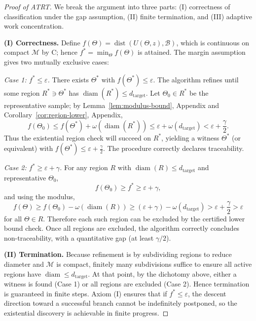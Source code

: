 \documentclass[12pt]{article}
\theoremstyle{definition}
\theoremstyle{plain}
\begin{document}
\begin{proof}[Proof of ATRT]
We break the argument into three parts: (I) correctness of classification under the gap assumption, (II) finite termination, and (III) adaptive work concentration.

\textbf{(I) Correctness.} Define \(f(\Theta)=\operatorname{dist}(U(\Theta,z),\mathcal B)\), which is continuous on compact \(\mathcal M\) by C; hence \(f^*=\min_\Theta f(\Theta)\) is attained. The margin assumption gives two mutually exclusive cases:

\emph{Case 1: \(f^*\le \varepsilon\).}  
There exists \(\Theta^*\) with \(f(\Theta^*)\le \varepsilon\). The algorithm refines until some region \(R^*\ni \Theta^*\) has \(\operatorname{diam}(R^*)\le d_{\mathrm{target}}\). Let \(\Theta_0\in R^*\) be the representative sample; by Lemma~\ref{lem:modulus-bound}, Appendix and Corollary~\ref{cor:region-lower}, Appendix,
\[
f(\Theta_0)\le f(\Theta^*) + \omega(\operatorname{diam}(R^*)) \le \varepsilon + \omega(d_{\mathrm{target}}) < \varepsilon + \frac{\gamma}{2}.
\]
Thus the existential region check will succeed on \(R^*\), yielding a witness \(\Theta^*\) (or equivalent) with \(f(\Theta^*)\le \varepsilon + \frac{\gamma}{2}\). The procedure correctly declares traceability.

\emph{Case 2: \(f^* \ge \varepsilon + \gamma\).}  
For any region \(R\) with \(\operatorname{diam}(R)\le d_{\mathrm{target}}\) and representative \(\Theta_0\),
\[
f(\Theta_0) \ge f^* \ge \varepsilon + \gamma,
\]
and using the modulus,
\[
f(\Theta) \ge f(\Theta_0) - \omega(\operatorname{diam}(R)) \ge (\varepsilon + \gamma) - \omega(d_{\mathrm{target}}) > \varepsilon + \frac{\gamma}{2} > \varepsilon
\]
for all \(\Theta\in R\). Therefore each such region can be excluded by the certified lower bound check. Once all regions are excluded, the algorithm correctly concludes non-traceability, with a quantitative gap (at least \(\gamma/2\)).

\textbf{(II) Termination.}  
Because refinement is by subdividing regions to reduce diameter and \(\mathcal M\) is compact, finitely many subdivisions suffice to ensure all active regions have \(\operatorname{diam}\le d_{\mathrm{target}}\). At that point, by the dichotomy above, either a witness is found (Case 1) or all regions are excluded (Case 2). Hence termination is guaranteed in finite steps. Axiom (I) ensures that if \(f^*\le \varepsilon\), the descent direction toward a successful branch cannot be indefinitely postponed, so the existential discovery is achievable in finite progress.


\end{proof}
\end{document}
